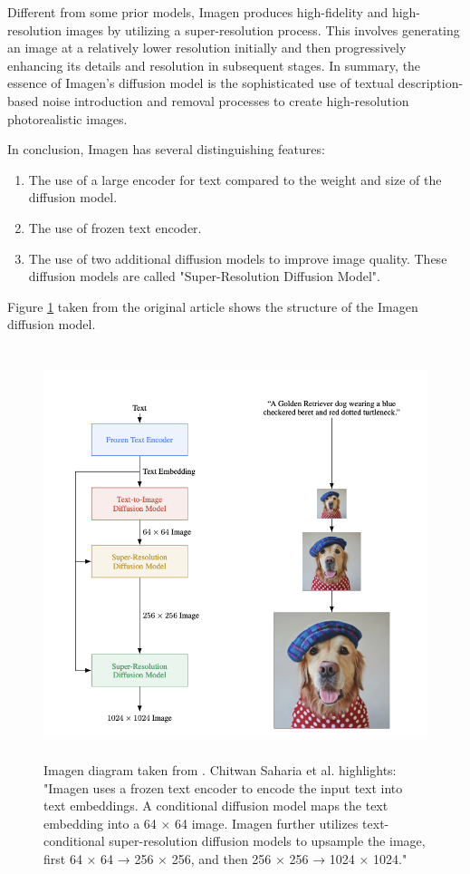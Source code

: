 Different from some prior models, Imagen produces high-fidelity and high-resolution images by utilizing a super-resolution process. This involves generating an image at a relatively lower resolution initially and then progressively enhancing its details and resolution in subsequent stages. In summary, the essence of Imagen's diffusion model is the sophisticated use of textual description-based noise introduction and removal processes to create high-resolution photorealistic images.

In conclusion, Imagen has several distinguishing features:
\begin{enumerate}
    \item The use of a large encoder for text compared to the weight and size of the diffusion model.
    \item The use of frozen text encoder.
    \item The use of two additional diffusion models to improve image quality. These diffusion models are called "Super-Resolution Diffusion Model".
\end{enumerate}
Figure \ref{fig:Imagen_diagram} \cite{Imagen} taken from the original article shows the structure of the Imagen diffusion model.
\begin{figure}[h]
\centering
\includegraphics[width=12cm, height=12cm]{figs/Imagen_diagram.png}
\caption{Imagen diagram taken from \cite{Imagen}. Chitwan Saharia et al. highlights: "Imagen uses a frozen text encoder to encode the input text
into text embeddings. A conditional diffusion model maps the text embedding into a 64 × 64 image.
Imagen further utilizes text-conditional super-resolution diffusion models to upsample the image,
first 64 × 64 → 256 × 256, and then 256 × 256 → 1024 × 1024."\cite[p.19]{Imagen}}
\label{fig:Imagen_diagram}
\end{figure}

